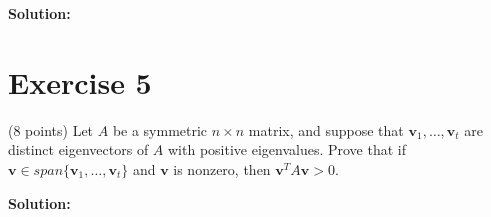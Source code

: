 \documentclass{article}
\begin{document}
\textbf{Solution:}

\newpage

\section*{Exercise 5}
(8 points) Let $A$ be a symmetric $n \times n$ matrix, and suppose that $\mathbf{v}_1,\ldots,\mathbf{v}_t$ are distinct eigenvectors of $A$ with positive eigenvalues. Prove that if $\mathbf{v} \in span\{\mathbf{v}_1,\ldots,\mathbf{v}_t\}$ and $\mathbf{v}$ is nonzero, then $\mathbf{v}^T A\mathbf{v} > 0$.

\textbf{Solution:}

\newpage
\end{document}
